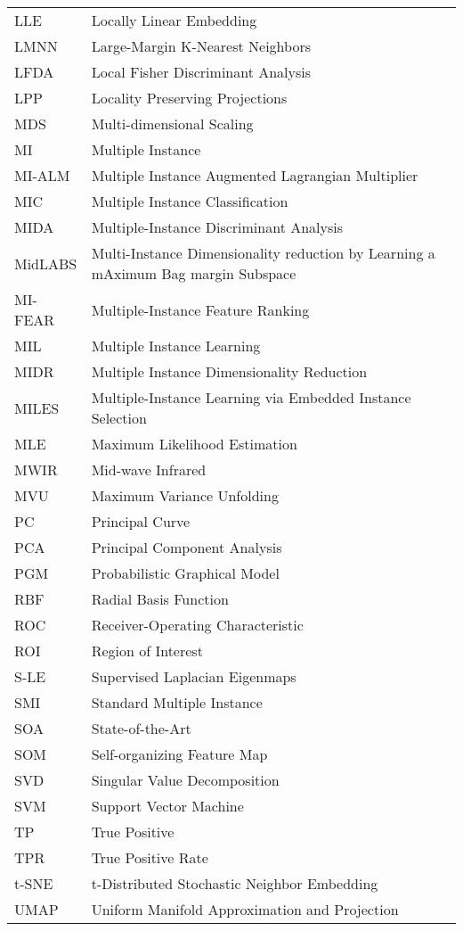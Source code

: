 \begin{longtable}{l p{5in}}
LLE & Locally Linear Embedding\\
LMNN & Large-Margin K-Nearest Neighbors\\
LFDA & Local Fisher Discriminant Analysis\\
LPP & Locality Preserving Projections\\
MDS & Multi-dimensional Scaling\\
MI & Multiple Instance\\
MI-ALM & Multiple Instance Augmented Lagrangian Multiplier\\
MIC & Multiple Instance Classification\\
MIDA & Multiple-Instance Discriminant Analysis\\
MidLABS & Multi-Instance Dimensionality reduction by Learning a mAximum Bag margin Subspace\\
MI-FEAR & Multiple-Instance Feature Ranking\\
MIL & Multiple Instance Learning\\
MIDR & Multiple Instance Dimensionality Reduction\\
MILES & Multiple-Instance Learning via Embedded Instance Selection\\
MLE & Maximum Likelihood Estimation\\
MWIR & Mid-wave Infrared\\
MVU & Maximum Variance Unfolding\\
PC & Principal Curve\\
PCA & Principal Component Analysis\\
PGM & Probabilistic Graphical Model\\
RBF & Radial Basis Function\\
ROC & Receiver-Operating Characteristic\\
ROI & Region of Interest\\
S-LE & Supervised Laplacian Eigenmaps\\
SMI& Standard Multiple Instance\\
SOA & State-of-the-Art\\
SOM & Self-organizing Feature Map\\
SVD & Singular Value Decomposition\\
SVM & Support Vector Machine\\
TP & True Positive\\
TPR & True Positive Rate\\
t-SNE & t-Distributed Stochastic Neighbor Embedding\\
UMAP & Uniform Manifold Approximation and Projection\\

 \end{longtable}



\doublespacing

